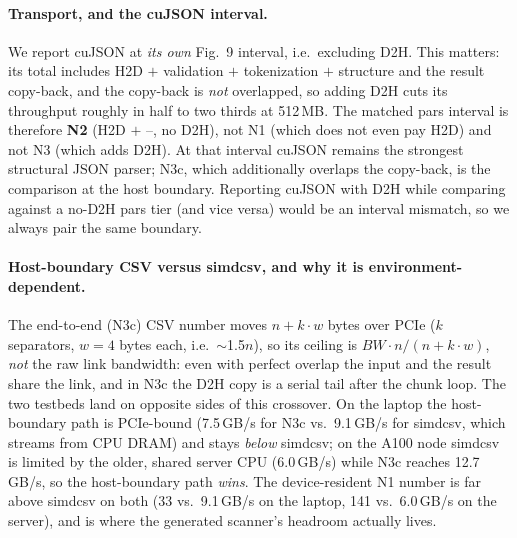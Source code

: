 \paragraph{Transport, and the \textsf{cuJSON} interval.}
We report \textsf{cuJSON} at \emph{its own} Fig.~9 interval, i.e.\ excluding D2H.
This matters: its total includes H2D $+$ validation $+$ tokenization $+$
structure and the result copy-back, and the copy-back is \emph{not} overlapped,
so adding D2H cuts its throughput roughly in half to two thirds at 512\,MB.
The matched pars interval is therefore \textbf{N2} (H2D $+$ \Rone--\Rsix, no
D2H), not N1 (which does not even pay H2D) and not N3 (which adds D2H).  At that
interval \textsf{cuJSON} remains the strongest structural JSON parser; N3c, which
additionally overlaps the copy-back, is the comparison at the host boundary.
Reporting \textsf{cuJSON} with D2H while comparing against a no-D2H pars tier
(and vice versa) would be an interval mismatch, so we always pair the same
boundary.

\paragraph{Host-boundary CSV versus \textsf{simdcsv}, and why it is
environment-dependent.}
The end-to-end (N3c) CSV number moves $n + k\cdot w$ bytes over PCIe
($k$ separators, $w{=}4$ bytes each, i.e.\ $\sim$1.5$n$), so its ceiling is
$BW\cdot n/(n+k\cdot w)$, \emph{not} the raw link bandwidth: even with perfect
overlap the input and the result share the link, and in N3c the D2H copy is a
serial tail after the chunk loop.  The two testbeds land on opposite sides of
this crossover.  On the laptop the host-boundary path is PCIe-bound
(7.5\,GB/s for N3c vs.\ 9.1\,GB/s for \textsf{simdcsv}, which streams from CPU
DRAM) and stays \emph{below} \textsf{simdcsv}; on the A100 node
\textsf{simdcsv} is limited by the older, shared server CPU (6.0\,GB/s) while
N3c reaches 12.7\,GB/s, so the host-boundary path \emph{wins}.  The
device-resident N1 number is far above \textsf{simdcsv} on both (33 vs.\
9.1\,GB/s on the laptop, 141 vs.\ 6.0\,GB/s on the server), and is where the
generated scanner's headroom actually lives.

